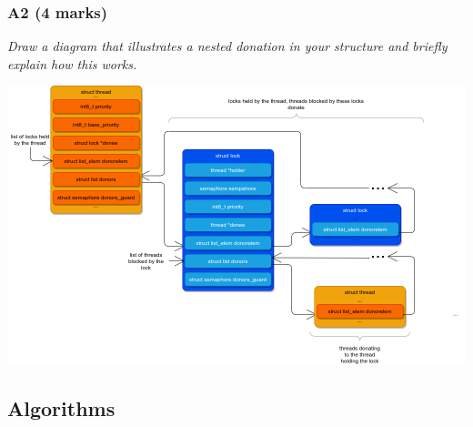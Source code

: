 \documentclass{report}
\newcommand{\question}[1]{\textit{#1} \\ }
\newcommand{\file}[1]{\textcolor{green}{\textbf{#1}}}
\newcommand{\pintoscode}[4]{}
\begin{document}
                \pintoscode{137}{137}{thread.h}{thread.h}
               
                \pintoscode{72}{72}{thread.c}{thread.c}
                
                \pintoscode{68}{69}{thread.c}{thread.c}
                
                \pintoscode{62}{63}{thread.c}{thread.c}
                
                \pintoscode{65}{66}{thread.c}{thread.c}

                \pintoscode{125}{131}{thread.h}{thread.h}

            \subsubsection*{A2  (4 marks) }
                \question{Draw a diagram that illustrates a nested donation in your structure and briefly explain how this works.}

                \begin{center}
                    \includegraphics[width=\textwidth]{donation.png}
                \end{center}

            \subsection*{Algorithms}
\end{document}
